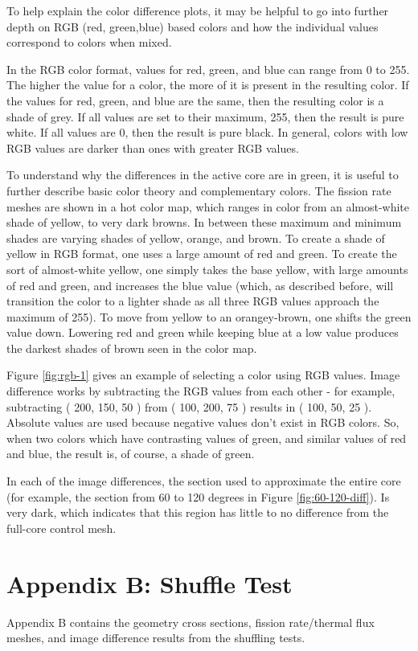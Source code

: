 To help explain the color difference plots, it may be helpful to go into further depth on RGB (red, green,blue) based colors and how the individual values correspond to colors when mixed.

In the RGB color format, values for red, green, and blue can range from 0 to 255.  The higher the value for a color, the more of it is present in the resulting color.  If the values for red, green, and blue are the same, then the resulting color is a shade of grey.  If all values are set to their maximum, 255, then the result is pure white.  If all values are 0, then the result is pure black.  In general, colors with low RGB values are darker than  ones with greater RGB values.

To understand why the differences in the active core are in green, it is useful to further describe basic color theory and complementary colors.  The fission rate meshes are shown in a hot color map, which ranges in color from an almost-white shade of yellow, to very dark browns.  In between these maximum and minimum shades are varying shades of yellow, orange, and brown.  To create a shade of yellow in RGB format, one uses a large amount of red and green.  To create the sort of almost-white yellow, one simply takes the base yellow, with large amounts of red and green, and increases the blue value (which, as described before, will transition the color to a lighter shade as all three RGB values approach the maximum of 255).  To move from yellow to an orangey-brown, one shifts the green value down.  Lowering red and green while keeping blue at a low value produces the darkest shades of brown seen in the color map.



Figure \ref{fig:rgb-1} gives an example of selecting a color using RGB values.  Image difference works by subtracting the RGB values from each other - for example, subtracting ( 200, 150, 50 ) from ( 100, 200, 75 ) results in ( 100, 50, 25 ).  Absolute values are used because negative values don't exist in RGB colors.  So, when  two colors which have contrasting values of green, and similar values of red and blue, the result is, of course, a shade of green.

In each of the image differences, the section used to approximate the entire core (for example, the section from 60 to 120 degrees in Figure \ref{fig:60-120-diff}).  Is very dark, which indicates that this region has little to no difference from the full-core control mesh.


\section{Appendix B: Shuffle Test}
Appendix B contains the geometry cross sections, fission rate/thermal flux meshes, and image difference results from the                                                                                                                                                                                                                                         shuffling tests.


